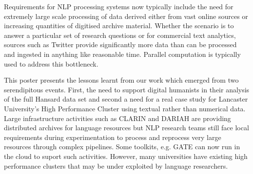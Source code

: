 

Requirements for NLP processing systems now typically include the need for extremely large scale processing of data derived either from vast online sources or increasing quantities of digitised archive material. 
Whether the scenario is to answer a particular set of research questions or for commercial text analytics, sources such as Twitter provide significantly more data than can be processed and ingested in anything like reasonable time. Parallel computation is typically used to address this bottleneck. 


This poster presents the lessons learnt from our work which emerged from two serendipitous events. First, the need to support digital humanists in their analysis of the full Hansard data set and second a need for a real case study for Lancaster University's High Performance Cluster using textual rather than numerical data. Large infrastructure activities such as CLARIN and DARIAH are providing distributed archives for language resources but NLP research teams still face local requirements during experimentation to process and reprocess very large resources through complex pipelines. Some toolkits, e.g. GATE can now run in the cloud to suport such activities. However, many universities have existing high performance clusters that may be under exploited by language researchers. 

